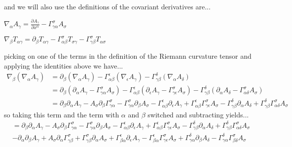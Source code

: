 \documentclass{article}
\begin{document}
and we will also use the definitions of the covariant derivatives are...
\begin{center}
$\nabla_{\alpha}A_{\gamma}=\frac{\partial A_{\gamma}}{\partial x^{\alpha}}-\Gamma^{\sigma}_{\gamma\alpha}A_{\sigma}$

$\nabla_{\beta}T_{\alpha\gamma}=\partial_{\beta}T_{\alpha\gamma}-\Gamma^{\sigma}_{\alpha\beta}T_{\sigma\gamma}-\Gamma^{\sigma}_{\gamma\beta}T_{\alpha\sigma}$
\end{center}
picking on one of the terms in the definition of the Riemann curvature tensor and applying the identities above we have...
\begin{align*}
\nabla_{\beta}(\nabla_{\alpha}A_{\gamma})&=\partial_{\beta}(\nabla_{\alpha}A_{\gamma})-\Gamma^{\epsilon}_{\alpha\beta}(\nabla_{\epsilon}A_{\gamma})-\Gamma^{\delta}_{\gamma\beta}(\nabla_{\alpha}A_{\delta})\\ &=\partial_{\beta}(\partial _{\alpha} A_{\gamma}-\Gamma^{\sigma}_{\gamma\alpha}A_{\sigma})-\Gamma^{\epsilon}_{\alpha\beta}(\partial_{\epsilon} A_{\gamma}-\Gamma^{\sigma}_{\gamma\epsilon}A_{\sigma})-\Gamma^{\delta}_{\gamma\beta}(\partial_{\alpha} A_{\delta}-\Gamma^{\sigma}_{\alpha\delta}A_{\sigma})\\&=\partial_{\beta}\partial_{\alpha}A_{\gamma}-A_{\sigma}\partial_{\beta}\Gamma^{\sigma}_{\gamma\alpha}-\Gamma^{\sigma}_{\gamma\alpha}\partial_{\beta}A_{\sigma}-\Gamma^{\epsilon}_{\alpha\beta}\partial_{\epsilon}A_{\gamma}+
\Gamma^{\epsilon}_{\alpha\beta}\Gamma^{\sigma}_{\gamma\epsilon}A_{\sigma}-\Gamma^{\delta}_{\gamma\beta}\partial_{\alpha}A_{\delta}+
\Gamma^{\delta}_{\gamma\beta}\Gamma^{\sigma}_{\alpha\delta}A_{\sigma}
\end{align*}
so taking this term and the term with $\alpha$ and $\beta$ switched and subtracting yields...
\begin{align*}
&=\partial_{\beta}\partial_{\alpha}A_{\gamma}-A_{\sigma}\partial_{\beta}\Gamma^{\sigma}_{\gamma\alpha}-\Gamma^{\sigma}_{\gamma\alpha}\partial_{\beta}A_{\sigma}-\Gamma^{\epsilon}_{\alpha\beta}\partial_{\epsilon}A_{\gamma}+
\Gamma^{\epsilon}_{\alpha\beta}\Gamma^{\sigma}_{\gamma\epsilon}A_{\sigma}-\Gamma^{\delta}_{\gamma\beta}\partial_{\alpha}A_{\delta}+
\Gamma^{\delta}_{\gamma\beta}\Gamma^{\sigma}_{\alpha\delta}A_{\sigma}\\ & -\partial_{\alpha}\partial_{\beta}A_{\gamma}+A_{\sigma}\partial_{\alpha}\Gamma^{\sigma}_{\gamma\beta}+\Gamma^{\sigma}_{\gamma\beta}\partial_{\alpha}A_{\sigma}+
\Gamma^{\epsilon}_{\beta\alpha}\partial_{\epsilon}A_{\gamma}-
\Gamma^{\epsilon}_{\beta\alpha}\Gamma^{\sigma}_{\gamma\epsilon}A_{\sigma}+\Gamma^{\delta}_{\gamma\alpha}\partial_{\beta}A_{\delta}-
\Gamma^{\delta}_{\gamma\alpha}\Gamma^{\sigma}_{\beta\delta}A_{\sigma}
\end{align*}
\end{document}
